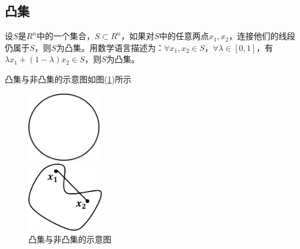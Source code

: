 	\subsection{凸集}
		\begin{definition}[凸集]
		设$S$是$R^n$中的一个集合，$S\subset R^n$，如果对$S$中的任意两点$x_1,x_2$，连接他们的线段仍属于$S$，则$S$为凸集。用数学语言描述为：$\forall x_1,x_2\in S$，$\forall \lambda \in [0,1]$，有$\lambda x_1+(1-\lambda)x_2\in S$，则$S$为凸集。
		\end{definition}
		凸集与非凸集的示意图如图(\ref{fig:凸集与非凸集的示意图})所示
		\begin{figure}[H]
		\centering
		\begin{varwidth}[t]{\textwidth}
		\vspace{0pt}
		\includegraphics[height=3cm]{images/convex_set.jpg}
		\end{varwidth}
		\qquad \qquad
		\begin{varwidth}[t]{\textwidth}
		\vspace{0pt}
		\includegraphics[height=3cm]{images/noconvex_set.jpg}
		\end{varwidth}
		\caption{凸集与非凸集的示意图}
		\label{fig:凸集与非凸集的示意图}
		\end{figure}

